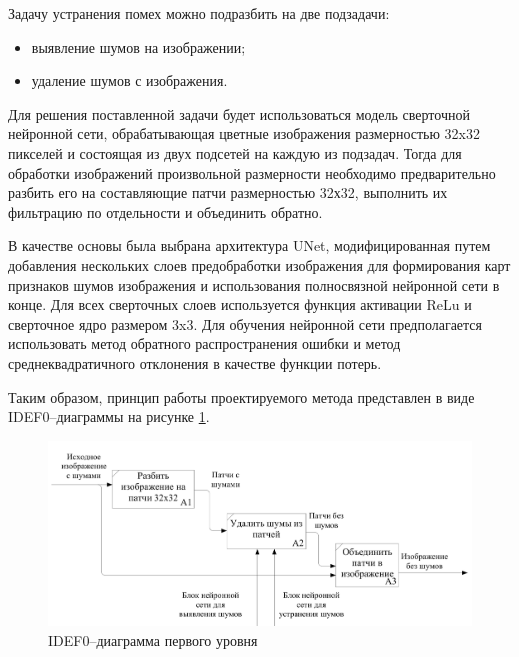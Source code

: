 Задачу устранения помех можно подразбить на две подзадачи:
\begin{itemize}
    \item выявление шумов на изображении;
    \item удаление шумов с изображения.
\end{itemize}

Для решения поставленной задачи будет использоваться модель сверточной нейронной сети, обрабатывающая цветные изображения размерностью 32x32 пикселей и состоящая из двух подсетей на каждую из подзадач. Тогда для обработки изображений произвольной размерности необходимо предварительно разбить его на составляющие патчи размерностью 32х32, выполнить их фильтрацию по отдельности и объединить обратно.

В качестве основы была выбрана архитектура UNet, модифицированная путем добавления нескольких слоев предобработки изображения для формирования карт признаков шумов изображения и использования полносвязной нейронной сети в конце. Для всех сверточных слоев используется функция активации ReLu и сверточное ядро размером 3x3. Для обучения нейронной сети предполагается использовать метод обратного распространения ошибки и метод среднеквадратичного отклонения в качестве функции потерь.

Таким образом, принцип работы проектируемого метода представлен в виде IDEF0--диаграммы на рисунке \ref{fig:concept}.

\begin{figure}[h!btp]
	\centering
	\includegraphics[scale = 0.50]{inc/analysis/02_A0.png}
	\caption{IDEF0--диаграмма первого уровня}
	\label{fig:concept}	
\end{figure}

